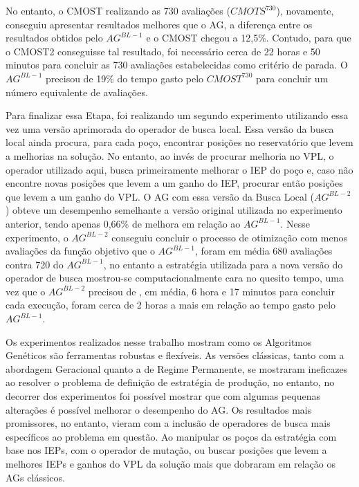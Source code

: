 No entanto, o CMOST realizando as 730 avaliações ($CMOTS^{730}$), novamente, conseguiu apresentar resultados melhores que o AG, a diferença entre os resultados obtidos pelo $AG^{BL-1}$ e o CMOST chegou a 12,5\%. Contudo, para que o CMOST2 conseguisse tal resultado, foi necessário cerca de 22 horas e 50 minutos para concluir as 730 avaliações estabelecidas como critério de parada. O $AG^{BL-1}$ precisou de 19\% do tempo gasto pelo $CMOST^{730}$ para concluir um número equivalente de avaliações.

Para finalizar essa Etapa, foi realizando um segundo experimento utilizando essa vez uma versão aprimorada do operador de busca local. Essa versão da busca local ainda procura, para cada poço, encontrar posições no reservatório que levem a melhorias na solução. No entanto, ao invés de procurar melhoria no VPL, o operador utilizado aqui, busca primeiramente melhorar o IEP do poço e, caso não encontre novas posições que levem a um ganho do IEP, procurar então posições que levem a um ganho do VPL. O AG com essa versão da Busca Local ($AG^{BL-2}$) obteve um desempenho semelhante a versão original utilizada no experimento anterior, tendo apenas 0,66\% de melhora em relação ao $AG^{BL-1}$.  Nesse experimento, o $AG^{BL-2}$ conseguiu concluir o processo de otimização com menos avaliações da função objetivo que o $AG^{BL-1}$, foram em média 680 avaliações contra 720 do $AG^{BL-1}$, no entanto a estratégia utilizada para a nova versão do operador de busca mostrou-se computacionalmente cara no quesito tempo, uma vez que o $AG^{BL-2}$ precisou de , em média, 6 hora e 17 minutos para concluir cada execução, foram cerca de 2 horas a mais em relação ao tempo gasto pelo $AG^{BL-1}$.
 	
Os experimentos realizados nesse trabalho mostram como os Algoritmos Genéticos são ferramentas robustas e flexíveis. As versões clássicas, tanto com a abordagem Geracional quanto a de Regime Permanente, se mostraram ineficazes ao resolver o problema de definição de estratégia de produção, no entanto, no decorrer dos experimentos foi possível mostrar que com algumas pequenas alterações é possível melhorar o desempenho do AG. Os resultados mais promissores, no entanto, vieram com a inclusão de operadores de busca mais específicos ao problema em questão. Ao manipular os poços da estratégia com base nos IEPs, com o operador de mutação, ou buscar posições que levem a melhores IEPs e ganhos do VPL da solução mais que dobraram em relação os AGs clássicos.
 	
